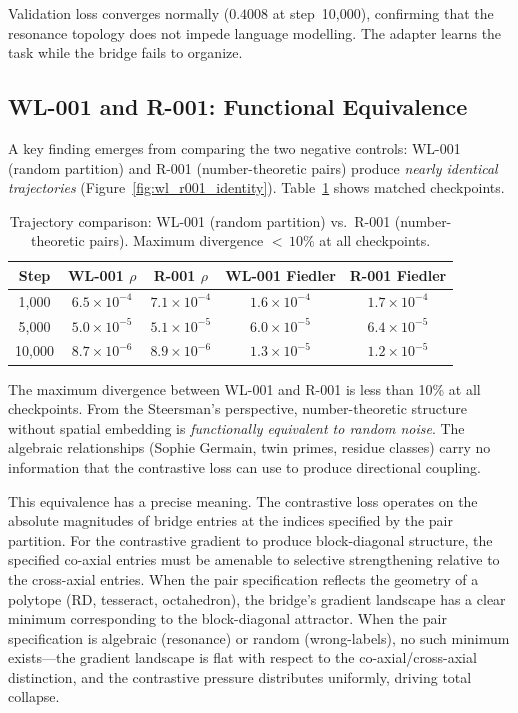 Validation loss converges normally ($0.4008$ at step~10{,}000),
confirming that the resonance topology does not impede language
modelling. The adapter learns the task while the bridge fails to
organize.

\subsection{WL-001 and R-001: Functional Equivalence}

A key finding emerges from comparing the two negative controls:
WL-001 (random partition) and R-001 (number-theoretic pairs) produce
\emph{nearly identical trajectories} (Figure~\ref{fig:wl_r001_identity}).
Table~\ref{tab:wl_r_compare} shows matched checkpoints.

\begin{table}[H]
\centering
\caption{Trajectory comparison: WL-001 (random partition) vs.\
  R-001 (number-theoretic pairs). Maximum divergence ${<}\,10\%$
  at all checkpoints.}
\label{tab:wl_r_compare}
\small
\begin{tabular}{ccccc}
\toprule
Step & WL-001 $\rho$ & R-001 $\rho$ & WL-001 Fiedler & R-001 Fiedler \\
\midrule
1{,}000 & $6.5 \times 10^{-4}$ & $7.1 \times 10^{-4}$ & $1.6 \times 10^{-4}$ & $1.7 \times 10^{-4}$ \\
5{,}000 & $5.0 \times 10^{-5}$ & $5.1 \times 10^{-5}$ & $6.0 \times 10^{-5}$ & $6.4 \times 10^{-5}$ \\
10{,}000 & $8.7 \times 10^{-6}$ & $8.9 \times 10^{-6}$ & $1.3 \times 10^{-5}$ & $1.2 \times 10^{-5}$ \\
\bottomrule
\end{tabular}
\end{table}

The maximum divergence between WL-001 and R-001 is less than 10\%
at all checkpoints. From the Steersman's perspective,
number-theoretic structure without spatial embedding is
\emph{functionally equivalent to random noise}. The algebraic
relationships (Sophie Germain, twin primes, residue classes) carry
no information that the contrastive loss can use to produce
directional coupling.

This equivalence has a precise meaning. The contrastive loss
operates on the absolute magnitudes of bridge entries at the
indices specified by the pair partition. For the contrastive gradient
to produce block-diagonal structure, the specified co-axial entries
must be amenable to selective strengthening relative to the
cross-axial entries. When the pair specification reflects the
geometry of a polytope (RD, tesseract, octahedron), the bridge's
gradient landscape has a clear minimum corresponding to the
block-diagonal attractor. When the pair specification is algebraic
(resonance) or random (wrong-labels), no such minimum exists---the
gradient landscape is flat with respect to the co-axial/cross-axial
distinction, and the contrastive pressure distributes uniformly,
driving total collapse.

